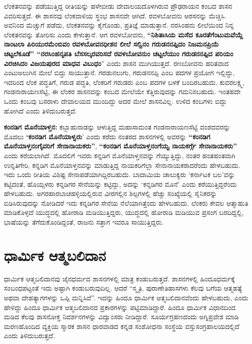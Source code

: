 ಲೆಂಕತನವನ್ನು ಪಡೆಯುತ್ತಿದ್ದ ರೀತಿಯನ್ನು ಹಳೇಬೀಡು ದೇವಾಲಯದೊಳಗಿರುವ ಪ್ರೌಢರಾಯನ ಕಂಬದ ಶಾಸನ ವಿವರಿಸುತ್ತದೆ. ಈ ಶಾಸನವು ಲೆಂಕವಾಳಿಯ ಸ್ಥಂಭ ಶಾಸನವೇ ಆಗಿದೆ. ರವಳಬೋವನು ಅರಸನನ್ನು ಮೆಚ್ಚಿಸಿ. ಅವನಿಂದ ಮೆಚ್ಚುಗೆ ಪಡೆದು, ಲೆಂಕತನವನ್ನು ಕೈಗೊಂಡು, ಪ್ರತಿಜ್ಞೆ ಮಾಡುತ್ತಾನೆ. ನರಸಿಂಹನು ಲೀಲೆಯಿಂದ ನಿನ್ನ ಲೆಂಕತನವನ್ನು ತೋರಿಸು ಎಂದು ಕೇಳುತ್ತಾನೆ. ಆಗ ರವಳಬೋವನು, \textbf{“ನಿಶಿತಾಸಿಯ ಮಸೆದ ಕೂರತೆಗೆಂಟುಮವೆಯ್ದೆ ನಾಂಟಲಾ ಪಿರಿಯುರಮೆಂಬಿವಂ ರವಳಬೋವನಧೀಶನ ಲೀಲೆ ಸಲ್ವಿನಂ ಗರುಡನನಪ್ಪಿದಂ ನಿಜಮನಪ್ರಿಯೆ ಚಟ್ಟಲೆಕೂಡೆ” “ನರಸಿಂಹನೃಪತಿ ಬೆಸಸಲ್ಕರವರಿಸದೆ ರವಳಬೋವನುಂ ಚಟ್ಟಲೆಯುಂ ಗರುಡನನಪ್ಪಿದ ಪರಿಯಂ ವಿರಚಿಸಿದಂ ವಿಜಯಪುರದ ಮಾಧವ ವಿಬುಧಂ}” ಎಂದು ಶಾಸನ ಮುಗಿಯುತ್ತದೆ. ರಣಬೋವನು ಹರಿತವಾದ ಎಂಟುಅಲುಗಿನ ಮೇಲೆ ಬಿದ್ದು ಸಾಯುತ್ತಾನೆ. ಗರಡುನಲುಗು, ಗರುಡನನಪ್ಪಿ ಎಂಬ ಪದಗಳ ಪ್ರಯೋಗ ಇಲ್ಲಿದ್ದು, ಇದರಿಂದ ಲೆಂಕ ಪದ್ಧತಿಗೆ, ಗರುಡ ಪದ್ಧತಿ, ಲೆಂಕರಿಗೆ ಗರುಡರು ಎಂಬ ಪದಗಳ ಬಳಕೆ ಬಂದಿರಬಹುದು. ಕುವರಲಕ್ಷ್ಮ, ಗಂಡನಾರಾಯಣಸೆಟ್ಟಿ, ಈ ಲೆಂಕರ ಶಾಸನವನ್ನು ಕಂಬದ ಮೇಲೆಯೇ ಕೆತ್ತಿರುವುದನ್ನು ಗಮನಿಸಬಹುದು. ಇಂತಹದೇ ಒಂದು ಕಂಬವು ಬಸರಾಳು ದೇವಾಲಯದ ಮುಂದಿದ್ದು ಅದರ ಮೇಲೆ ಶಾಸನವಿಲ್ಲ. ಉಳಿದ ಕಂಬಗಳು ಬಿದ್ದು ಹೋಗಿದೆ ಎಂದು ತಿಳಿದುಬರುತ್ತದೆ.

\textbf{ಕಂನಡಿಗ ಮೊನೆಯಾಳ್ತನ: }ಕಬ್ಬಾಹುನಾಡನ್ನು ಆಳುತ್ತಿದ್ದ ಮಹಾಸಾಮಂತ ಗಂಡನಾರಾಯಣಸೆಟ್ಟಿ ವಂಶದವರನ್ನು ಮೊದಲು \textbf{‘ಕಂನಡಿಗ ಮೊನೆಯಾಳ್ವರು}’ ಎಂದು ಕರೆದು ನಂತರದ ಶಾಸನಗಳಲ್ಲಿ ಅವರನ್ನು \textbf{“ಕಂನಡಿಗ ಮೊನೆಯಾಳ್ತನಂಗೈವರಿಗೆ ಸೇನಾನಾಯಕರು”}, \textbf{“ಕಂನಡಿಗ ಮೊನೆಯಾಳ್ತನಂಗೆಯ್ವ ನಾಯಕರ್ಗ್ಗೆ ಸೇನಾನಾಯಕರು”} ಎಂದು ಕರೆಯಲಾಗಿದೆ. ಮೊದಲಿಗೆ ಇವರು ಕನ್ನಡಿಗ ಮೊನೆಯಾಳ್ತನವನ್ನು ಗೆಯ್ಯುತ್ತಿದ್ದು, ನಂತರ ಹಂತಹಂತವಾಗಿ ಉನ್ನತಿಗೇರಿ, ಕನ್ನಡಿಗ ಮೊನೆಯಾಳ್ತನವನ್ನು ಮಾಡುತ್ತಿದ್ದ ನಾಯಕರಿಗೆಲ್ಲಾ ಸೇನಾನಾಯಕರಾದರೆಂದು ಹೇಳಬಹುದು. ಇದು ಒಂದು ರೀತಿಯ ವಿಶಿಷ್ಟ ಸೇನಾಪಡೆಯಾಗಿದ್ದಿರ\-ಬಹುದು. ಬಾದಾಮಿಯ ಚಾಲುಕ್ಯರು ‘ಕರ್ನಾಟಕ ಬಲ’ವನ್ನು ಕಟ್ಟಿದಂತೆ, ಹೊಯ್ಸಳರು ಕನ್ನಡಿಗರ ಸೇನೆಯನ್ನು ಕಟ್ಟಿದ್ದು, ಅದನ್ನು ‘ಕನ್ನಡಿಗರ ಮೊನೆ’ ಎಂದು ಕರೆಯುತ್ತಿದ್ದರೆಂದು ಹೇಳಬಹುದು. ಅಗರಹಾರಬಾಚಹಳ್ಳಿಯಲ್ಲಿರುವ ವೀರಗಲ್ಲಿನ ಶಿಲ್ಪಗಳಲ್ಲಿ ಹೆಚ್ಚು ಸಂಖ್ಯೆಯಲ್ಲಿ ಸೈನಿಕರನ್ನು ಬಿಡಿಸಿರುವುದನ್ನು ನೋಡಿದರೆ ಇದು ಕನ್ನಡಿಗರ ಸೇನೆಯ ನೆಲೆಯಾಗಿತ್ತೆಂದು ಹೇಳಬಹುದು. ಲೆಂಕರು ಕೇವಲ ಆತ್ಮಾಹುತಿ ಮಾಡಿಕೊಳ್ಳದೆ ಯುದ್ಧದಲ್ಲಿ ಹೋರಾಡಿ ಮಡಿಯುತ್ತಿದ್ದರು, ಯುದ್ಧದಲ್ಲಿ ಹೋರಾಡಿ ಮಡಿಯುವ ಪ್ರಸಂಗ ಬರದಿದ್ದಲ್ಲಿ, ಭಾಷೆಯನ್ನು ತೆಗೆದುಕೊಂಡಿದ್ದಂತೆ, ರಾಜನು ಸತ್ತಾಗ ಇವರೂ ಸಾಯುತ್ತಿದ್ದರು.

\section{ಧಾರ್ಮಿಕ ಆತ್ಮಬಲಿದಾನ}

ಧಾರ್ಮಿಕ ಆತ್ಮಬಲಿದಾನವು ಜೈನಧರ್ಮದ ಶಾಸನಗಳಲ್ಲಿ ಮಾತ್ರ ಕಂಡುಬರುತ್ತದೆ. ಶಾಸನಗಳಲ್ಲಿ ಹಿಂದೂಧರ್ಮಕ್ಕೆ ಸಂಬಂಧಪಟ್ಟಂತೆ ಇದು ಅಷ್ಟಾಗಿ ಕಂಡುಬರುವುದಿಲ್ಲ. ಆದರೆ “ಸ್ಮೃತಿ, ಪುರಾಣೇತಿಹಾಸಗಳು ಕೆಲವು ಬಗೆಯ ಆತ್ಮಹತ್ಯೆ ಅಥವಾ ದೇಹತ್ಯಾಗಗಳನ್ನು ಒಪ್ಪಿ ಮನ್ನಿಸಿವೆ”. ಇದನ್ನು ಹಿಂದೂ ಧಾರ್ಮಿಕ ಆತ್ಮಬಲಿದಾನವೆಂದು ಹೇಳಬಹುದು, ಎಂದು ಹೇಳಿದ್ದು ಹಿಂದೂ ಧಾರ್ಮಿಕ ಆತ್ಮಬಲಿದಾನದ ಪ್ರಕಾರಗಳನ್ನು ಪಟ್ಟಿಮಾಡಿದ್ದಾರೆ. ಹಿಂದೂ ಧಾರ್ಮಿಕ ವಿಧಾನದಿಂದ ಮಡಿದ ಕೆಲವು ಶಾಸನೋಕ್ತ ನಿದರ್ಶನಗಳನ್ನು ವಿದ್ವಾಂಸರು ನೀಡಿದ್ದಾರೆ. ಸೂರ್ಯಗ್ರಹಣದಂದು ಅಗ್ನಿಪ್ರವೇಶ ಮಾಡಿ ಮರಣಹೊಂದಿದ ವ್ಯಕ್ತಿಯ ಸ್ಮಾರಕ ಶಾಸನ ಧಾರವಾಡದ ಕನ್ನಡ ಸಂಶೋಧನಾ ಸಂಸ್ಥೆಯ ವಸ್ತುಸಂಗ್ರಹಾಲಯದಲ್ಲಿದೆ ಎಂದು ತಿಳಿದುಬರುತ್ತದೆ.

